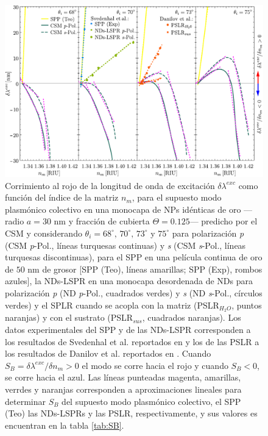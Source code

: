 \begin{figure}[b!]\centering
	\includegraphics[width=\linewidth]{2-Resultados/figs/11-SPPCSM/1_comparacionAugtEye.pdf}\vspace*{-.7em}
	\caption{%
Corrimiento al rojo de la longitud de onda de excitación $\delta\lambda^{exc}$ como función del índice de la matriz $n_m$, para el supuesto modo  plasmónico colectivo en una monocapa de NPs idénticas de oro ---radio $a=30$ nm y fracción de cubierta $\Theta=0.125$--- predicho por el CSM y  considerando $\theta_i=68^\circ,\, 70^\circ,\, 73^\circ$ y $75^\circ$ para polarización  \emph{p} (CSM \textit{p}-Pol., líneas turquesas continuas) y \emph{s} (CSM \textit{s}-Pol., líneas turquesas discontinuas), para el SPP en una película continua de oro de $50$ nm de grosor [SPP (Teo), líneas amarillas; SPP (Exp), rombos azules], la NDs-LSPR  en una monocapa desordenada de NDs para polarización \emph{p} (ND \textit{p}-Pol., cuadrados verdes) y \emph{s} (ND \textit{s}-Pol., círculos verdes) y el SPLR cuando se acopla con la matriz (PSLR$_{H_{2}O}$, puntos naranjas) y con el sustrato (PSLR$_{sus}$, cuadrados naranjas). Los datos experimentales del SPP y de las NDs-LSPR corresponden a los resultados de Svedenhal et al. reportados en \cite{svedendahl2009refractometric} y los de las PSLR a los resultados de Danilov et al. reportados en \cite{danilov2018ultra}. Cuando $S_B=\delta\lambda^{exc}/\delta n_m>0$ el modo se corre hacia el rojo y cuando $S_B<0$, se corre hacia el azul. Las líneas punteadas magenta, amarillas, verrdes y naranjas corresponden a aproximaciones lineales para determinar $S_B$ del supuesto modo plasmónico colectivo, el SPP (Teo) las NDs-LSPRs y las PSLR, respectivamente, y sus valores es encuentran en la tabla  \ref{tab:SB}.}\label{fig:SensThetai}
	\end{figure}	

